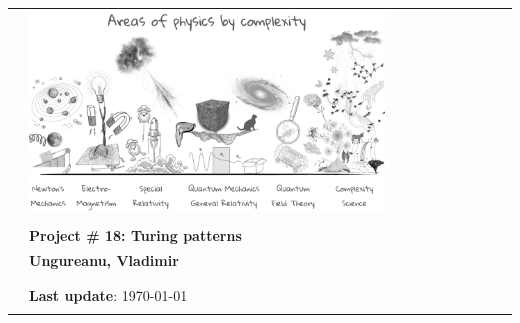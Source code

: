 \begin{center}
\begin{spacing}{1.3}
\begin{tabular}{p{4cm} ll}
&  \includegraphics[width=0.77\textwidth]{images/areas_of_physics.png} \\\\
& \textcolor{unipd}{\textbf{\huge Project \# 18: Turing patterns}}\\ %
& \textbf{Ungureanu, Vladimir}\\
& \\
& \\
& \scriptsize \textbf{Last update}: \today\\\\
\end{tabular}

\end{spacing}

\end{center}



\thispagestyle{empty} %
\clearpage\setcounter{page}{1} %
